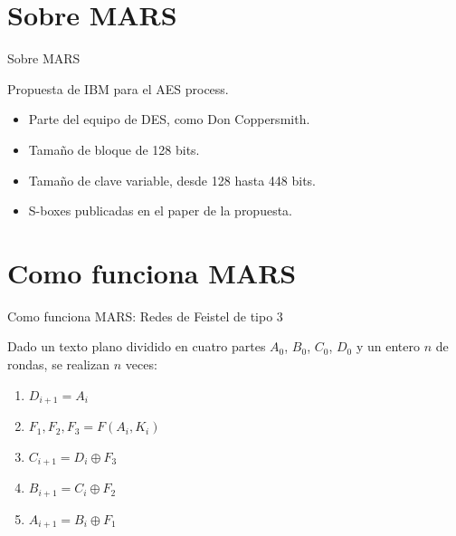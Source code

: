 \documentclass{beamer}
\begin{document}
\section{Sobre MARS}
\begin{frame}{Sobre MARS}

	Propuesta de IBM para el AES process.

	\begin{itemize}
		\item Parte del equipo de DES, como Don Coppersmith.
		\item Tamaño de bloque de 128 bits.
		\item Tamaño de clave variable, desde 128 hasta 448 bits.
		\item S-boxes publicadas en el paper de la propuesta.
	\end{itemize}



\end{frame}

\section{Como funciona MARS}
\begin{frame}{Como funciona MARS: Redes de Feistel de tipo 3}

	Dado un texto plano dividido en cuatro partes $A_0$, $B_0$, $C_0$, $D_0$ y un entero $n$ de rondas, se realizan $n$ veces:

	\begin{enumerate}
		\item $D_{i + 1} = A_i$
		\item $F_1, F_2, F_3 = F(A_i, K_i)$
		\item $C_{i + 1} = D_i \oplus F_3$
		\item $B_{i + 1} = C_i \oplus F_2$
		\item $A_{i + 1} = B_i \oplus F_1$
	\end{enumerate}


\end{frame}
\end{document}
